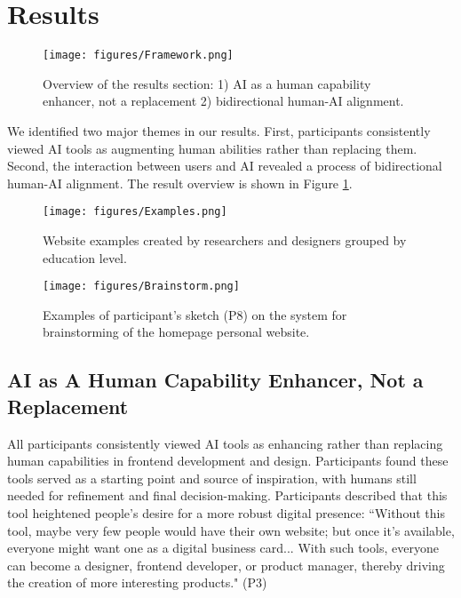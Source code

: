 \section{Results}
\label{sec:results}

\FloatBarrier
\begin{figure}
  \centering
  \texttt{[image: figures/Framework.png]}
    \caption{Overview of the results section: 1) AI as a human capability enhancer, not a replacement 2) bidirectional human-AI alignment.}
    \label{fig:framework}
  \end{figure}
  
We identified two major themes in our results. First, participants consistently viewed AI tools as augmenting human abilities rather than replacing them. Second, the interaction between users and AI revealed a process of bidirectional human-AI alignment. The result overview is shown in Figure \ref{fig:framework}. 

\begin{figure}
  \centering
\texttt{[image: figures/Examples.png]}
    \caption{Website examples created by researchers and designers grouped by education level.}
\label{fig:website_example}
  \end{figure}
  
  \begin{figure}
    \centering
    \texttt{[image: figures/Brainstorm.png]}
      \caption{Examples of participant's sketch (P8) on the system for brainstorming of the homepage personal website.}
      \label{fig:brainstorm}
    \end{figure}

\subsection{AI as A Human Capability Enhancer, Not a Replacement}
All participants consistently viewed AI tools as enhancing rather than replacing human capabilities in frontend development and design. Participants found these tools served as a starting point and source of inspiration, with humans still needed for refinement and final decision-making. Participants described that this tool heightened people's desire for a more robust digital presence: ``Without this tool, maybe very few people would have their own website; but once it's available, everyone might want one as a digital business card... With such tools, everyone can become a designer, frontend developer, or product manager, thereby driving the creation of more interesting products." (P3)

